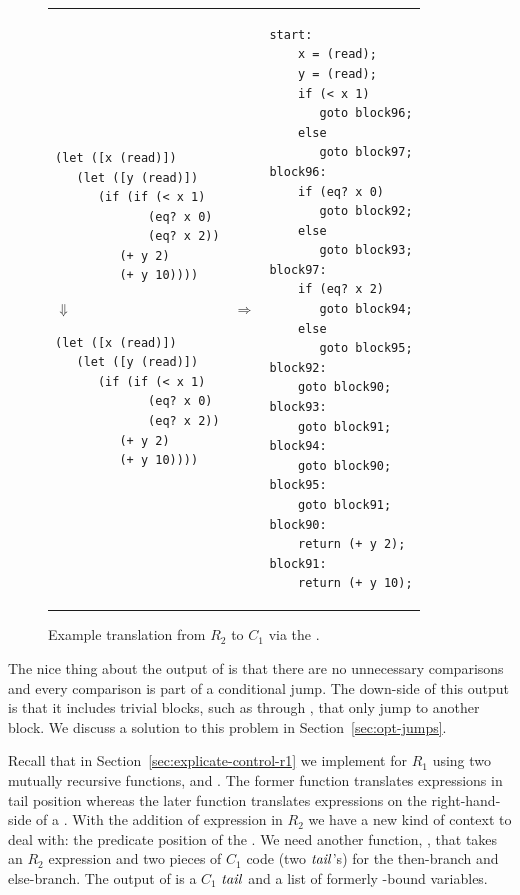 \documentclass[11pt]{book}
\begin{document}
\begin{figure}[tbp]
\begin{tabular}{lll}
\begin{minipage}{0.4\textwidth}
\begin{lstlisting}
(let ([x (read)])
   (let ([y (read)])
      (if (if (< x 1)
             (eq? x 0)
             (eq? x 2))
         (+ y 2)
         (+ y 10))))
\end{lstlisting}
\hspace{40pt}$\Downarrow$
\begin{lstlisting}
(let ([x (read)])
   (let ([y (read)])
      (if (if (< x 1)
             (eq? x 0)
             (eq? x 2))
         (+ y 2)
         (+ y 10))))
\end{lstlisting}
\end{minipage}
&
$\Rightarrow$
&
\begin{minipage}{0.55\textwidth}
\begin{lstlisting}
start:
    x = (read);
    y = (read);
    if (< x 1)
       goto block96;
    else
       goto block97;
block96:
    if (eq? x 0)
       goto block92;
    else
       goto block93;
block97:
    if (eq? x 2)
       goto block94;
    else
       goto block95;
block92:
    goto block90;
block93:
    goto block91;
block94:
    goto block90;
block95:
    goto block91;
block90:
    return (+ y 2);
block91:
    return (+ y 10);
\end{lstlisting}
\end{minipage}
\end{tabular} 

\caption{Example translation from $R_2$ to $C_1$
  via the .}
\label{fig:explicate-control-s1-38}
\end{figure}

The nice thing about the output of  is that
there are no unnecessary comparisons and every comparison is part of a
conditional jump. The down-side of this output is that it includes
trivial blocks, such as  through , that
only jump to another block. We discuss a solution to this problem in
Section~\ref{sec:opt-jumps}.

Recall that in Section~\ref{sec:explicate-control-r1} we implement
 for $R_1$ using two mutually recursive
functions,  and .  The
former function translates expressions in tail position whereas the
later function translates expressions on the right-hand-side of a
. With the addition of  expression in $R_2$ we have a
new kind of context to deal with: the predicate position of the
. We need another function, , that takes
an $R_2$ expression and two pieces of $C_1$ code (two $\mathit{tail}$'s) for
the then-branch and else-branch. The output of 
is a $C_1$ $\mathit{tail}$ and a list of formerly -bound variables.
\end{document}
